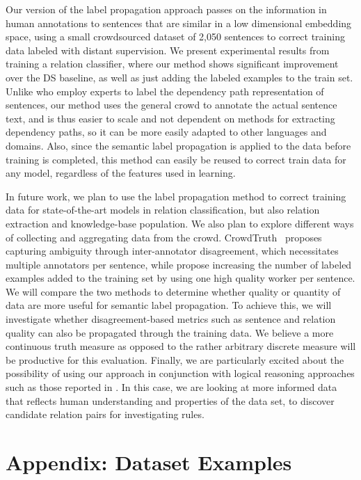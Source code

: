 Our version of the label propagation approach passes on the information in human annotations to sentences that are similar in a low dimensional embedding space, using a small crowdsourced dataset of 2,050 sentences to correct training data labeled with distant supervision.  We present experimental results from training a relation classifier, where our method shows significant improvement over the DS baseline, as well as just adding the labeled examples to the train set. Unlike \citet{sterckx2016knowledge} who employ experts to label the dependency path representation of sentences, our method uses the general crowd to annotate the actual sentence text, and is thus easier to scale and not dependent on methods for extracting dependency paths, so it can be more easily adapted to other languages and domains.  Also, since the semantic label propagation is applied to the data before training is completed, this method can easily be reused to correct train data for any model, regardless of the features used in learning.

In future work, we plan to use the label propagation method to correct training data for state-of-the-art models in relation classification, but also relation extraction and knowledge-base population. We also plan to explore different ways of collecting and aggregating data from the crowd. CrowdTruth~\cite{dumitrache2017false} proposes capturing ambiguity through inter-annotator disagreement, which necessitates multiple annotators per sentence, while \citet{liu2016effective} propose increasing the number of labeled examples added to the training set by using one high quality worker per sentence. We will compare the two methods to determine whether quality or quantity of data are more useful for semantic label propagation. To achieve this, we will investigate whether disagreement-based metrics such as sentence and relation quality can also be propagated through the training data. We believe a more continuous truth measure as opposed to the rather arbitrary discrete measure will be productive for this evaluation. Finally, we are particularly excited about the possibility of using our approach in conjunction with logical reasoning approaches such as those reported in \cite{demeester2016regularizing}.  In this case, we are looking at more informed data that reflects human understanding and properties of the data set, to discover candidate relation pairs for investigating rules. 

\newpage

\section{Appendix: Dataset Examples}
\label{sec:appendix4.1}

